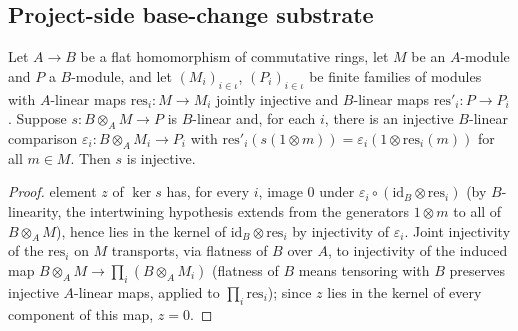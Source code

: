 \subsection{Project-side base-change substrate}
\label{mk-subsec:quot_project_basechange}


\begin{lemma}
  \label{mk-lem:section_base_change_injective_cover}
  \leanok
  Let \(A \to B\) be a flat homomorphism of commutative rings, let \(M\) be
  an \(A\)-module and \(P\) a \(B\)-module, and let \((M_i)_{i \in \iota}\),
  \((P_i)_{i \in \iota}\) be finite families of modules with \(A\)-linear
  maps \(\mathrm{res}_i : M \to M_i\) jointly injective and \(B\)-linear
  maps \(\mathrm{res}'_i : P \to P_i\). Suppose \(s : B \otimes_A M \to P\)
  is \(B\)-linear and, for each \(i\), there is an injective \(B\)-linear
  comparison \(\varepsilon_i : B \otimes_A M_i \to P_i\) with
  \(\mathrm{res}'_i(s(1 \otimes m)) = \varepsilon_i(1 \otimes
  \mathrm{res}_i(m))\) for all \(m \in M\). Then \(s\) is injective.
\end{lemma}
\begin{proof}
  \leanokAn element \(z\) of \(\ker s\) has, for every \(i\), image \(0\) under
  \(\varepsilon_i \circ (\mathrm{id}_B \otimes \mathrm{res}_i)\) (by
  \(B\)-linearity, the intertwining hypothesis extends from the generators
  \(1 \otimes m\) to all of \(B \otimes_A M\)), hence lies in the kernel of
  \(\mathrm{id}_B \otimes \mathrm{res}_i\) by injectivity of \(\varepsilon_i\).
  Joint injectivity of the \(\mathrm{res}_i\) on \(M\) transports, via
  flatness of \(B\) over \(A\), to injectivity of the induced map
  \(B \otimes_A M \to \prod_i (B \otimes_A M_i)\) (flatness of \(B\) means
  tensoring with \(B\) preserves injective \(A\)-linear maps, applied to
  \(\prod_i \mathrm{res}_i\)); since \(z\) lies in the kernel of every
  component of this map, \(z = 0\).
\end{proof}

